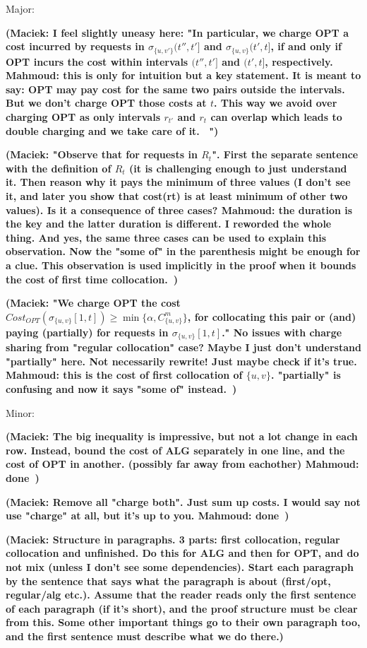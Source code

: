 \documentclass[manuscript,screen=true, review, anonymous]{acmart}
\newcommand\mahmoud[1]{\color{orange}\textbf{Mahmoud: #1~}\color{black}}
\newcommand\maciek[1]{\color{brown}\textbf{(Maciek: #1)}\color{black}}
\begin{document}
Major:

\maciek{I feel slightly uneasy here: "In particular,
we charge OPT a cost incurred by requests in
$\sigma_{\{u,v'\}}(t'',t']$ and $\sigma_{\{u,v\}}(t',t]$,
if and only if  OPT incurs the cost within  intervals $(t'', t']$ and $(t', t]$,
respectively.
\mahmoud{this is only for intuition but a key statement. It is meant to say: OPT may pay cost for the same two pairs outside the intervals. But we don't charge OPT  those costs at $t$. This way we avoid over charging OPT as only intervals $r_{t'}$ and $r_t$ can overlap which leads to double charging and we take care of it.}
"}

\maciek{"Observe that for requests in $R_t$". First the separate sentence with the definition of $R_t$ (it is challenging enough to just understand it. Then reason why it pays the minimum of three values (I don't see it, and later you show that cost(rt) is at least minimum of other two values). Is it a consequence of three cases? \mahmoud{the duration is the key and the latter duration is different. I reworded the whole thing. And yes, the same three cases can be used to explain this observation. Now the "some of" in the parenthesis might be enough for a clue. This observation is  used implicitly in the proof when it bounds the cost of first time collocation.}}

\maciek{"We charge OPT the cost
$\mathit{Cost}_{\mathit{OPT}} (\sigma_{\{u,v\}}[1,t]) 
\geq \min{ \{ \alpha, C^{m}_{ \{u,v\} } \} }$,
for collocating this pair or (and) paying (partially) for requests in $\sigma_{\{u,v\}}[1,t]$." No issues with charge sharing from "regular collocation" case? Maybe I just don't understand "partially" here. Not necessarily rewrite! Just maybe check if it's true.
\mahmoud{this is the cost of first collocation of $\{u,v\}$. "partially" is confusing and now it says "some of" instead.}}

Minor:

\maciek{The big inequality is impressive, but not a lot change in each row. Instead, bound the cost of ALG separately in one line, and the cost of OPT in another. (possibly far away from eachother) \mahmoud{done}}

\maciek{Remove all "charge both". Just sum up costs. I would say not use "charge" at all, but it's up to you. \mahmoud{done}}


\maciek{Structure in paragraphs. 3 parts: first collocation, regular collocation and unfinished. Do this for ALG and then for OPT, and do not mix (unless I don't see some dependencies). Start each paragraph by the sentence that says what the paragraph is about (first/opt, regular/alg etc.). Assume that the reader reads only the first sentence of each paragraph (if it's short), and the proof structure must be clear from this. Some other important things go to their own paragraph too, and the first sentence must describe what we do there.}
\end{document}
